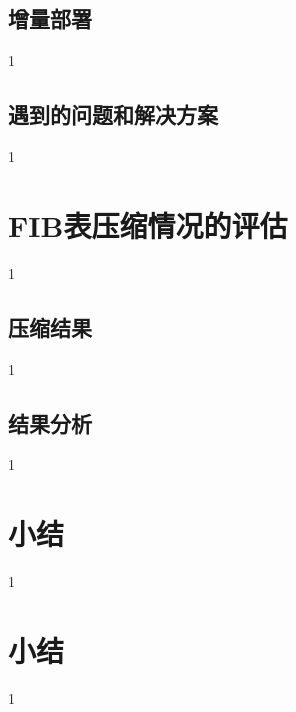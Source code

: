 \subsection{增量部署}
1
\subsection{遇到的问题和解决方案}
1
\section{FIB表压缩情况的评估}
1
\subsection{压缩结果}
1
\subsection{结果分析}
1
\section{小结}
1


\section{小结}
1
